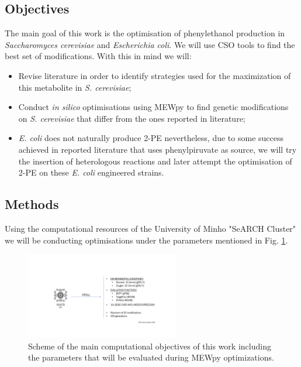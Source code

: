 \documentclass[runningheads]{llncs}
\begin{document}
\subsection{Objectives}
\hspace{0.5cm}The main goal of this work is the optimisation of phenylethanol production in \emph{Saccharomyces cerevisiae} and \emph{Escherichia coli}. We will use CSO tools to find the best set of modifications. With this in mind we will: 
\begin{itemize}
    \item[\ding{227}] Revise literature in order to identify strategies used for the maximization of this metabolite in \emph{S. cerevisiae};
    \item[\ding{227}] Conduct \emph{in silico} optimisations using MEWpy \cite{pereira2021mewpy} to find genetic modifications on \emph{S. cerevisiae} that differ from the ones reported in literature;
    \item[\ding{227}] \emph{E. coli} does not naturally produce 2-PE nevertheless, due to some success achieved in reported literature that uses phenylpiruvate as source, we will try the insertion of heterologous reactions and later attempt the optimisation of 2-PE on these \emph{E. coli} engineered strains.
\end{itemize}

\subsection{Methods}

Using the computational resources of the University of Minho "SeARCH Cluster" we will be conducting optimisations under the parameters mentioned in Fig. \ref{fig:methodsscheme}.

\begin{figure}[htbp]
    \centering
    \includegraphics[width=0.60\textwidth]{imagens/METHODS_SCHEME_atualizado.png}
    \caption{Scheme of the main computational objectives of this work including the parameters that will be evaluated during MEWpy optimizations.}
    \label{fig:methodsscheme}
\end{figure}
\end{document}
